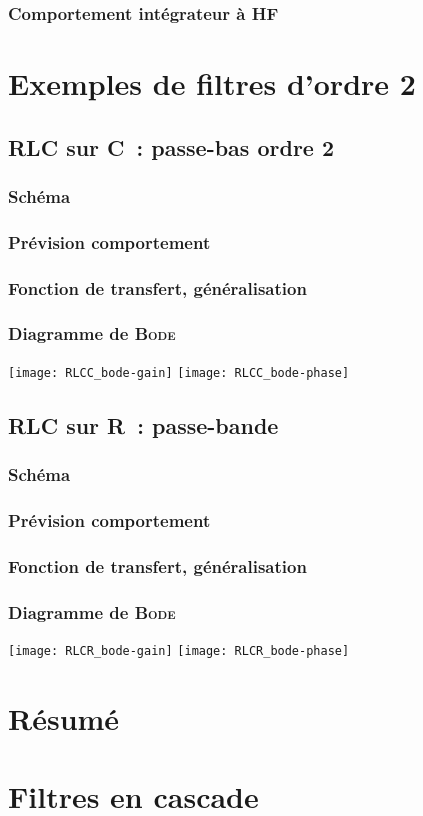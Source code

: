 \documentclass[../../main/main.tex]{subfiles}
\begin{document}
\subsubsection{Comportement intégrateur à HF}

\section{Exemples de filtres d'ordre 2}
\subsection{RLC sur C~: passe-bas ordre 2}
\subsubsection{Schéma}
\subsubsection{Prévision comportement}
\subsubsection{Fonction de transfert, généralisation}
\subsubsection{Diagramme de \textsc{Bode}}
\begin{center}
	\texttt{[image: RLCC\_bode-gain]}
	\texttt{[image: RLCC\_bode-phase]}
\end{center}

\subsection{RLC sur R~: passe-bande}
\subsubsection{Schéma}
\subsubsection{Prévision comportement}
\subsubsection{Fonction de transfert, généralisation}
\subsubsection{Diagramme de \textsc{Bode}}
\begin{center}
	\texttt{[image: RLCR\_bode-gain]}
	\texttt{[image: RLCR\_bode-phase]}
\end{center}

\section{Résumé}

\section{Filtres en cascade}
\end{document}
